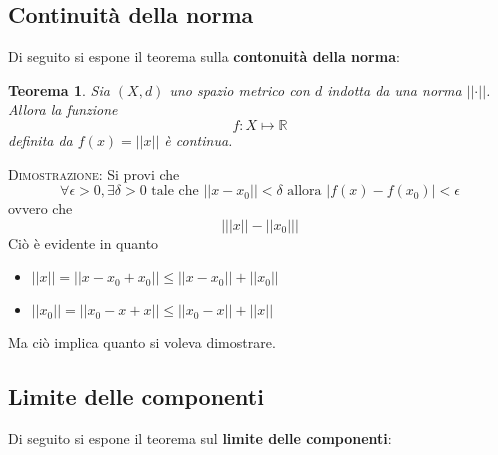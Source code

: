 \documentclass[a4paper]{extarticle}
\newtheorem{theorem}{Teorema}[section]
\begin{document}
\vspace{1em}
\noindent
\subsection{Continuità della norma}
Di seguito si espone il teorema sulla \textbf{contonuità della norma}:

\begin{theorem}
    Sia $(X,d)$ uno spazio metrico con $d$ indotta da una norma $\left \vert \left \vert \cdot \right \vert \right \vert$. Allora la funzione
    \[f : X \longmapsto \mathbb{R}\]
    definita da $f(x) = \left \vert \left \vert x \right \vert \right \vert$ è continua.
\end{theorem}

\vspace{2em}
\noindent
\normalfont \normalsize
\textsc{Dimostrazione}: Si provi che
\[\forall \epsilon > 0, \exists \delta > 0 \text{ tale che } \left \vert \left \vert x-x_0 \right \vert \right \vert < \delta \text{ allora } \left \vert f(x)-f(x_0)\right \vert < \epsilon\]
ovvero che
\[\left \vert \left \vert \left \vert x \right \vert \right \vert - \left \vert \left \vert x_0 \right \vert \right \vert \right \vert\]
Ciò è evidente in quanto
\begin{itemize}
    \item $\left \vert \left \vert x \right \vert \right \vert = \left \vert \left \vert x-x_0+x_0 \right \vert \right \vert \leq \left \vert \left \vert x-x_0 \right \vert \right \vert + \left \vert \left \vert x_0 \right \vert \right \vert$
    \item $\left \vert \left \vert x_0 \right \vert \right \vert = \left \vert \left \vert x_0-x+x \right \vert \right \vert \leq \left \vert \left \vert x_0-x \right \vert \right \vert + \left \vert \left \vert x \right \vert \right \vert$
\end{itemize}
Ma ciò implica quanto si voleva dimostrare.

\vspace{1em}
\noindent
\subsection{Limite delle componenti}
Di seguito si espone il teorema sul \textbf{limite delle componenti}:
\end{document}
